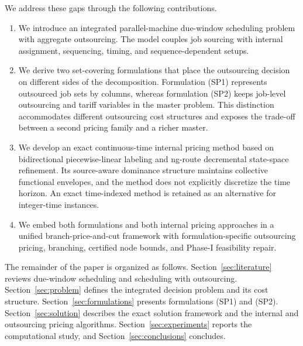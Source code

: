 We address these gaps through the following contributions.
\begin{enumerate}[label=(\roman*)]
    \item We introduce an integrated parallel-machine due-window scheduling
    problem with aggregate outsourcing. The model couples job sourcing with
    internal assignment, sequencing, timing, and sequence-dependent setups.

    \item We derive two set-covering formulations that place the outsourcing
    decision on different sides of the decomposition. Formulation \textup{(SP1)}
    represents outsourced job sets by columns, whereas formulation \textup{(SP2)}
    keeps job-level outsourcing and tariff variables in the master problem.
    This distinction accommodates different outsourcing cost structures and
    exposes the trade-off between a second pricing family and a richer master.

    \item We develop an exact continuous-time internal pricing method based on
    bidirectional piecewise-linear labeling and ng-route decremental state-space
    refinement. Its source-aware dominance structure maintains collective
    functional envelopes, and the method does not explicitly discretize the time
    horizon. An exact time-indexed method is retained as an alternative for
    integer-time instances.

    \item We embed both formulations and both internal pricing approaches in a
    unified branch-price-and-cut framework with formulation-specific outsourcing
    pricing, branching, certified node bounds, and Phase-I feasibility repair.
\end{enumerate}

The remainder of the paper is organized as follows.
Section~\ref{sec:literature} reviews due-window scheduling and scheduling with
outsourcing. Section~\ref{sec:problem} defines the integrated decision problem and
its cost structure. Section~\ref{sec:formulations} presents formulations
\textup{(SP1)} and \textup{(SP2)}. Section~\ref{sec:solution} describes the exact
solution framework and the internal and outsourcing pricing algorithms.
Section~\ref{sec:experiments} reports the computational study, and
Section~\ref{sec:conclusions} concludes.
